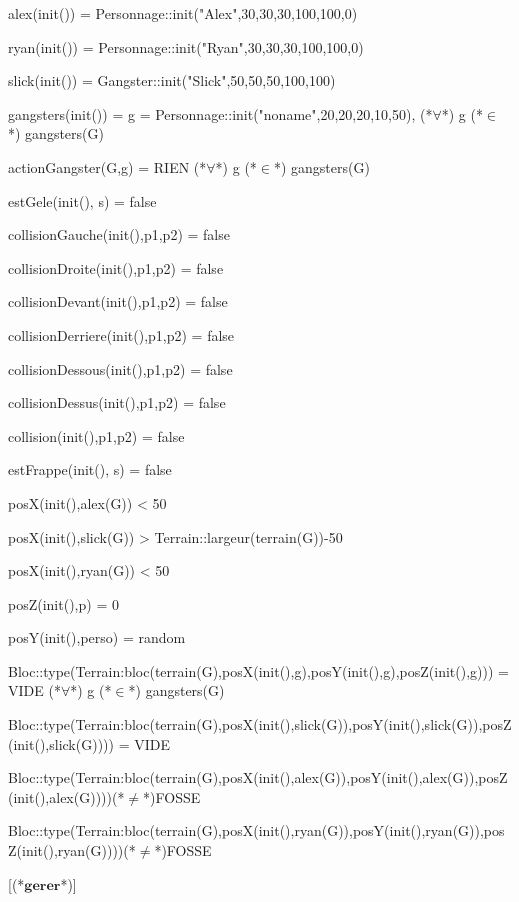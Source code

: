\documentclass[a4paper, 11pt]{report}
\newcommand{\specB}[1]{\textbf{#1}}
\begin{document}
\begin{landscape}
\begin{Spe}
	alex(init()) = Personnage::init("Alex",30,30,30,100,100,0)
	
	ryan(init()) = Personnage::init("Ryan",30,30,30,100,100,0)
	
	slick(init()) = Gangster::init("Slick",50,50,50,100,100)
	
	gangsters(init()) = {g = Personnage::init("noname",20,20,20,10,50)}, (*$\forall$*) g (*$\in$*) gangsters(G)
	
	actionGangster(G,g) = RIEN (*$\forall$*) g (*$\in$*) gangsters(G)
	
	estGele(init(), s) = false
	
	collisionGauche(init(),p1,p2) = false
	
	collisionDroite(init(),p1,p2) = false
	
	collisionDevant(init(),p1,p2) = false
	
	collisionDerriere(init(),p1,p2) = false
	
	collisionDessous(init(),p1,p2) = false
	
	collisionDessus(init(),p1,p2) = false
	
	collision(init(),p1,p2) = false
	
	estFrappe(init(), s) = false
	
	posX(init(),alex(G)) < 50
	
	posX(init(),slick(G)) > Terrain::largeur(terrain(G))-50
	
	posX(init(),ryan(G)) < 50
	
	posZ(init(),p) = 0
	
	posY(init(),perso) = random
	
	Bloc::type(Terrain:bloc(terrain(G),posX(init(),g),posY(init(),g),posZ(init(),g))) = VIDE (*$\forall$*) g (*$\in$*) gangsters(G)
	
	Bloc::type(Terrain:bloc(terrain(G),posX(init(),slick(G)),posY(init(),slick(G)),posZ(init(),slick(G)))) = VIDE
	
	Bloc::type(Terrain:bloc(terrain(G),posX(init(),alex(G)),posY(init(),alex(G)),posZ(init(),alex(G))))(*$\ne$*)FOSSE
	
	Bloc::type(Terrain:bloc(terrain(G),posX(init(),ryan(G)),posY(init(),ryan(G)),posZ(init(),ryan(G))))(*$\ne$*)FOSSE


	 [(*$\specB{gerer}$*)]
	 

\end{Spe}
\end{landscape}
\end{document}
